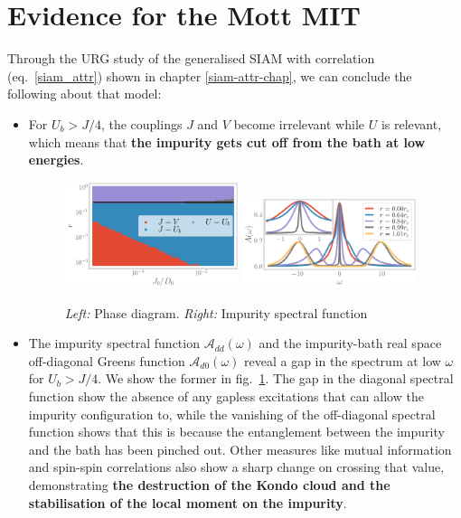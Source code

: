 \documentclass{report}
\numberwithin{equation}{section}
\begin{document}
\section{Evidence for the Mott MIT}
Through the URG study of the generalised SIAM with correlation (eq.~\ref{siam_attr}) shown in chapter \ref{siam-attr-chap}, we can conclude the following about that model:
\begin{itemize}
	\item For \(U_b > J/4\), the couplings \(J\) and \(V\) become irrelevant while \(U\) is relevant, which means that \textbf{the impurity gets cut off from the bath at low energies}.
\begin{figure}[htpb]
	\centering
	\includegraphics[width=0.48\textwidth]{../figures/phase-map-MIT.pdf}
	\includegraphics[width=0.48\textwidth]{../figures/spectral-function.pdf}
	\caption{{\it Left:} Phase diagram. {\it Right:} Impurity spectral function}
	\label{spec_func_mit}
\end{figure}

\item The impurity spectral function \(\mathcal{A}_{dd}(\omega)\) and the impurity-bath real space off-diagonal Greens function \(\mathcal{A}_{d0}(\omega)\) reveal a gap in the spectrum at low \(\omega\) for \(U_b > J/4\). We show the former in fig.~\ref{spec_func_mit}. The gap in the diagonal spectral function show the absence of any gapless excitations that can allow the impurity configuration to, while the vanishing of the off-diagonal spectral function shows that this is because the entanglement between the impurity and the bath has been pinched out. Other measures like mutual information and spin-spin correlations also show a sharp change on crossing that value, demonstrating \textbf{the destruction of the Kondo cloud and the stabilisation of the local moment on the impurity}.


\end{itemize}
\end{document}
